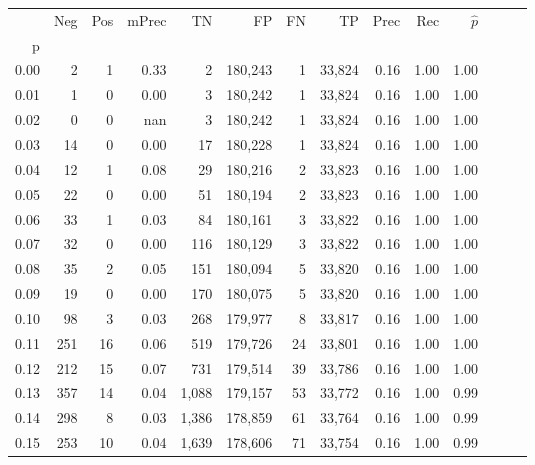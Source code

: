 \begin{tabular}{rrrrrrrrrrrrrr}
\toprule
{} &    Neg &    Pos & mPrec &       TN &       FP &      FN &      TP &  Prec &   Rec & $\hat{p}$ \\
p    &        &        &       &          &          &         &         &       &       &           \\
\midrule
0.00 &      2 &      1 &  0.33 &        2 &  180,243 &       1 &  33,824 &  0.16 &  1.00 &      1.00 \\
0.01 &      1 &      0 &  0.00 &        3 &  180,242 &       1 &  33,824 &  0.16 &  1.00 &      1.00 \\
0.02 &      0 &      0 &   nan &        3 &  180,242 &       1 &  33,824 &  0.16 &  1.00 &      1.00 \\
0.03 &     14 &      0 &  0.00 &       17 &  180,228 &       1 &  33,824 &  0.16 &  1.00 &      1.00 \\
0.04 &     12 &      1 &  0.08 &       29 &  180,216 &       2 &  33,823 &  0.16 &  1.00 &      1.00 \\
0.05 &     22 &      0 &  0.00 &       51 &  180,194 &       2 &  33,823 &  0.16 &  1.00 &      1.00 \\
0.06 &     33 &      1 &  0.03 &       84 &  180,161 &       3 &  33,822 &  0.16 &  1.00 &      1.00 \\
0.07 &     32 &      0 &  0.00 &      116 &  180,129 &       3 &  33,822 &  0.16 &  1.00 &      1.00 \\
0.08 &     35 &      2 &  0.05 &      151 &  180,094 &       5 &  33,820 &  0.16 &  1.00 &      1.00 \\
0.09 &     19 &      0 &  0.00 &      170 &  180,075 &       5 &  33,820 &  0.16 &  1.00 &      1.00 \\
0.10 &     98 &      3 &  0.03 &      268 &  179,977 &       8 &  33,817 &  0.16 &  1.00 &      1.00 \\
0.11 &    251 &     16 &  0.06 &      519 &  179,726 &      24 &  33,801 &  0.16 &  1.00 &      1.00 \\
0.12 &    212 &     15 &  0.07 &      731 &  179,514 &      39 &  33,786 &  0.16 &  1.00 &      1.00 \\
0.13 &    357 &     14 &  0.04 &    1,088 &  179,157 &      53 &  33,772 &  0.16 &  1.00 &      0.99 \\
0.14 &    298 &      8 &  0.03 &    1,386 &  178,859 &      61 &  33,764 &  0.16 &  1.00 &      0.99 \\
0.15 &    253 &     10 &  0.04 &    1,639 &  178,606 &      71 &  33,754 &  0.16 &  1.00 &      0.99 \\

\end{tabular}
